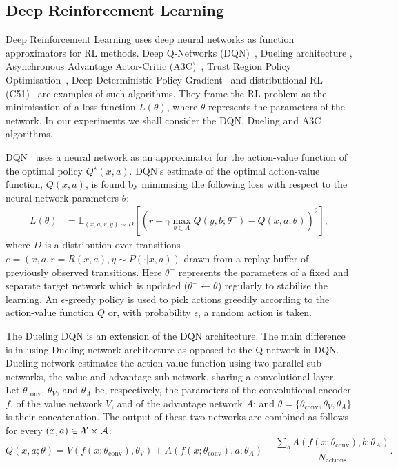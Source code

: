 \documentclass{article}
\begin{document}
\subsection{Deep Reinforcement Learning}

Deep Reinforcement Learning uses deep neural networks as function approximators for RL methods. Deep Q-Networks (DQN)~\citep{mnih2015human}, Dueling architecture \citep{wang2016Dueling}, Asynchronous Advantage Actor-Critic (A3C)~\citep{mnih2016asynchronous}, Trust Region Policy Optimisation~\citep{schulman2015trust}, Deep Deterministic Policy Gradient~\citep{lillicrap2015continuous} and distributional RL (C51)~\citep{bellemare2017distributional} are examples of such algorithms. They frame the RL problem as the minimisation of a loss function $L(\theta)$, where $\theta$ represents the parameters of the network. In our experiments we shall consider the DQN, Dueling and A3C algorithms. 

DQN~\citep{mnih2015human} uses a neural network as an approximator for the action-value function of the optimal policy $Q^\star(x, a)$.
DQN's estimate of the optimal action-value function, $Q(x,a)$, is found by minimising the following loss with respect to the neural network parameters $\theta$:
\begin{align}
L(\theta)&=\mathbb{E}_{(x,a,r,y)\sim D}\left[\left(r+ \gamma \max_{b \in A}Q(y,b;\theta^-)-Q(x,a;\theta)\right)^2\right],
\end{align} 
where $D$ is a distribution over transitions $e=(x,a,r=R(x,a),y\sim P(\cdot|x,a))$ drawn from a replay buffer of previously observed transitions. 
Here $\theta^-$ represents the parameters of a fixed and separate target network which is updated ($\theta^-\leftarrow\theta$) regularly to stabilise the learning.
An $\epsilon$-greedy policy is used to pick actions greedily according to
the action-value function $Q$ or, with probability $\epsilon$, a random action is taken.

The Dueling DQN  \citep{wang2016Dueling} is an extension of the DQN  architecture. The main difference is in using Dueling network architecture as opposed to the Q network in DQN. Dueling network estimates the action-value function using two parallel sub-networks, the value and advantage sub-network, sharing a convolutional layer. Let $\theta_{\text{conv}}$, $\theta_V$, and $\theta_A$ be, respectively, the parameters of the convolutional encoder $f$, of the value network $V$, and of the advantage network $A$; and $\theta =\{\theta_{\text{conv}},\theta_V,\theta_A\}$ is their concatenation. The output of these two networks are combined  as follows for every  $(x,a)\in \mathcal X\times\mathcal A$:
%
\begin{equation} 
\label{Dueling}
Q(x,a;\theta) = V(f(x;\theta_{\text{conv}}),\theta_V) + A(f(x;\theta_{\text{conv}}),a;\theta_A) - \frac{\sum_{b}A(f(x;\theta_{\text{conv}}),b;\theta_A)}{N_\text{actions}}.
\end{equation}
%
\end{document}
